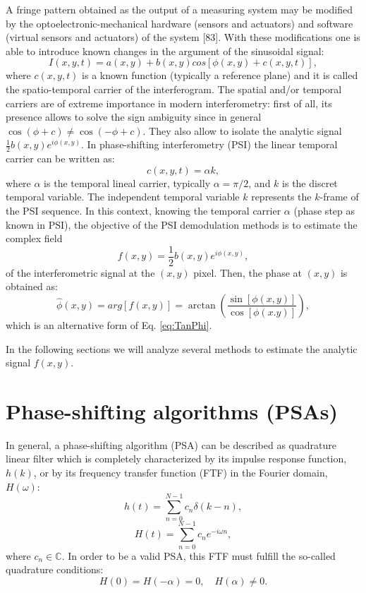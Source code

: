 A fringe pattern obtained as the output of a measuring system may be modified
by the optoelectronic-mechanical hardware (sensors and actuators) and software
(virtual sensors and actuators) of the system [83]. With these modifications one
is able to introduce known changes in the argument of the sinusoidal signal:
\begin{equation}
 I(x,y,t)=a(x,y)+b(x,y)cos[\phi(x,y)+c(x,y,t)],
\end{equation}
where $c(x,y,t)$ is a known function (typically a reference plane) and it is 
called the spatio-temporal carrier of the interferogram. The spatial and/or 
temporal carriers are of extreme importance in modern interferometry: first of 
all, its presence allows to solve the sign ambiguity since in general 
$\cos(\phi+c)\not=\cos(-\phi+c)$. They also allow to isolate the analytic signal
$\frac{1}{2} b(x,y)e^{i \phi(x,y)}$. In phase-shifting interferometry (PSI) the
linear temporal carrier can be written as:
\begin{equation}
 c(x,y,t)=\alpha k,
\end{equation}
where $\alpha$ is the temporal lineal carrier, typically $\alpha=\pi/2$, and $k$
is the discret temporal variable. The independent temporal variable $k$ represents
the $k$-frame of the PSI sequence. In this context, knowing the temporal carrier 
$\alpha$ (phase step as known in PSI), the objective of the PSI demodulation 
methods is to estimate the complex field
\begin{equation}\label{eq:Complexfield}
 f(x,y)=\frac{1}{2}b(x,y)e^{i\phi(x,y)},
\end{equation}
of the interferometric signal at the $(x,y)$ pixel. Then, the phase at $(x,y)$ 
is obtained as:
\begin{equation}\label{eq:PSIphase}
  \hat{\phi}(x,y)=arg[f(x,y)]=\arctan\left(\frac{\sin[\phi(x,y)]}{\cos[\phi(x.y)]}
\right),
\end{equation}
which is an alternative form of Eq. \eqref{eq:TanPhi}.

In the following sections we will analyze several methods to estimate the 
analytic signal $f(x,y)$.

\section{Phase-shifting algorithms (PSAs)}

In general, a phase-shifting algorithm (PSA) can be described as quadrature linear
filter which is completely characterized by its impulse response function, $h(k)$,
or by its frequency transfer function (FTF) in the Fourier domain, $H(\omega)$:
\begin{equation}
 h(t)=\sum^{N-1}_{n=0} c_n \delta(k-n),
\end{equation}
\begin{equation}
 H(t)=\sum^{N-1}_{n=0} c_n e^{-i\omega n},
\end{equation}
where ${c_n} \in \mathbb{C}$. In order to be a valid PSA, this FTF must fulfill
the so-called quadrature conditions:
\begin{equation}
 H(0)=H(-\alpha)=0, \quad H(\alpha)\not=0.
\end{equation}

